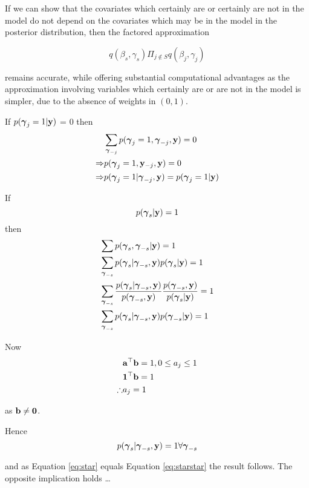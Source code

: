 \documentclass{amsart}[12pt]
\theoremstyle{definition}
\begin{document}
If we can show that the covariates which certainly are or certainly are not in the model do not depend on the
covariates which may be in the model in the posterior distribution, then the factored approximation

\[
	q(\beta_s, \gamma_s) \Pi_{j \notin S} q(\beta_j, \gamma_j)
\]

remains accurate, while offering substantial computational advantages as the approximation involving variables
which certainly are or are not in the model is simpler, due to the absence of weights in $(0, 1)$.

If $p({\boldsymbol \gamma}_j = 1|{\bf y})$ = 0
then
\begin{align*}
	            & \sum_{{\boldsymbol \gamma}_{-j}} p({\boldsymbol \gamma}_j=1, {\boldsymbol \gamma}_{-j}, {\bf y}) = 0 \\
	\Rightarrow & p({\boldsymbol \gamma}_j = 1, {\bf y}_{-j}, {\bf y}) = 0                       \\
	\Rightarrow & p({\boldsymbol \gamma}_j = 1| {\boldsymbol \gamma}_{-j}, {\bf y}) = p({\boldsymbol \gamma}_j=1|{\bf y})  \\
\end{align*}

If 
\begin{equation}\label{eq:star}
	p({\boldsymbol \gamma}_s|{\bf y}) = 1
\end{equation}
then
\begin{align*}
	  & \sum p({\boldsymbol \gamma}_s, {\boldsymbol \gamma}_{-s}|{\bf y}) = 1                                                                                            \\
	  & \sum_{{\boldsymbol \gamma}_{-s}} p({\boldsymbol \gamma}_s|{\boldsymbol \gamma}_{-s}, {\bf y}) p({\boldsymbol \gamma}_s|{\bf y}) = 1                                                            \\
	  & \sum_{{\boldsymbol \gamma}_{-s}} \frac{p({\boldsymbol \gamma}_s|{\boldsymbol \gamma}_{-s}, {\bf y})}{p({\boldsymbol \gamma}_{-s}, {\bf y})} \frac{p({\boldsymbol \gamma}_{-s}, {\bf y})}{ p({\boldsymbol \gamma}_s|{\bf y})} = 1 \\
	  & \sum_{{\boldsymbol \gamma}_{-s}} p({\boldsymbol \gamma}_s|{\boldsymbol \gamma}_{-s}, {\bf y}) p({\boldsymbol \gamma}_{-s}|{\bf y}) = 1                                                         \\
\end{align*}

Now
\begin{align*}
	           & {\bf a}^\top {\bf b} = 1, 0 \leq a_j \leq 1 \\
	           & {\bf 1}^\top {\bf b} = 1                  \\
	\therefore & a_j = 1                             \\
\end{align*}

as ${\bf b} \ne {\bf0}$.

Hence
\begin{equation}\label{eq:starstar}
	p({\boldsymbol \gamma}_s|{\boldsymbol \gamma}_{-s}, {\bf y}) = 1 \forall {\boldsymbol\gamma}_{-s}
\end{equation}

and as Equation \ref{eq:star} equals Equation \ref{eq:starstar} the result follows. The opposite implication
holds \ldots



\end{document}
